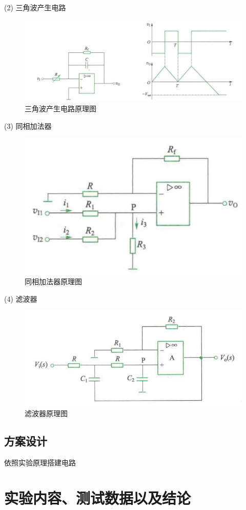\documentclass[12pt, a4paper]{article}
\begin{document}
(2) 三角波产生电路

\begin{figure}[ht]
    \centering
    \includegraphics[width=0.6\linewidth]{image/3.png}
    \caption{三角波产生电路原理图}
    \label{fig:三角波产生电路原理图}
\end{figure}

(3) 同相加法器

\begin{figure}[ht]
    \centering
    \includegraphics[width=0.6\linewidth]{image/4.png}
    \caption{同相加法器原理图}
    \label{fig:同相加法器原理图}
\end{figure}
\clearpage
(4) 滤波器

\begin{figure}[ht]
    \centering
    \includegraphics[width=0.6\linewidth]{image/5.png}
    \caption{滤波器原理图}
    \label{fig:滤波器原理图}
\end{figure}

\subsection{方案设计}
依照实验原理搭建电路

\clearpage
  \section{实验内容、测试数据以及结论}
\end{document}
